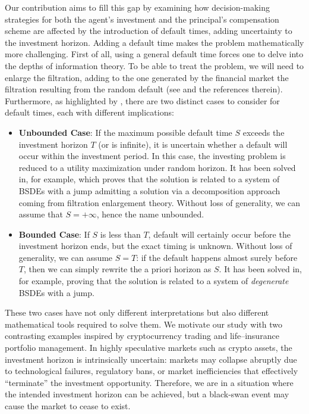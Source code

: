 \documentclass[11pt,a4paper]{article}
\theoremstyle{thmstyleone}%
\theoremstyle{thmstyletwo}%
\theoremstyle{thmstylethree}%
\begin{document}
Our contribution aims to fill this gap by examining how decision-making strategies for both the agent's investment and the principal's compensation scheme are affected by the introduction of default times, adding uncertainty to the investment horizon. Adding a default time makes the problem mathematically more challenging. First of all, using a general default time forces one to delve into the depths of information theory. To be able to treat the problem, we will need to enlarge the filtration, adding to the one generated by the financial market the filtration resulting from the random default (see \cite{jeanblanc2009mathematical,bielecki2013credit,aksamit2017enlargement,Guo_2008} and the references therein). Furthermore, as highlighted by \cite{jeanblanc2015utility}, there are two distinct cases to consider for default times, each with different implications:
\begin{itemize}
    \item \textbf{Unbounded Case}: If the maximum possible default time $S$ exceeds the investment horizon $T$ (or is infinite), it is uncertain whether a default will occur within the investment period. In this case, the investing problem is reduced to a utility maximization under random horizon. It has been solved in, for example, \cite{ kharroubi2013mean} which proves that the solution is related to a system of BSDEs with a jump admitting a solution via a decomposition approach coming from filtration enlargement theory. Without loss of generality, we can assume that $S = +\infty$, hence the name unbounded.
    \item \textbf{Bounded Case}: If $S$ is less than $T$, default will certainly occur before the investment horizon ends, but the exact timing is unknown. Without loss of generality, we can assume $S = T$: if the default happens almost surely before $T$, then we can simply rewrite the a priori horizon as $S$. It has been solved in, for example, \cite{jeanblanc2014note,jeanblanc2015utility} proving that the solution is related to a system of \textit{degenerate} BSDEs with a jump.
\end{itemize}
These two cases have not only different interpretations but also different mathematical tools required to solve them. 
We motivate our study with two contrasting examples inspired by
cryptocurrency trading and life–insurance portfolio management.
In highly speculative markets such as crypto assets, the investment
horizon is intrinsically uncertain: markets may collapse abruptly due to technological failures, regulatory bans, or market inefficiencies that effectively ``terminate'' the investment opportunity. Therefore, we are in a situation where the intended investment horizon can be achieved, but a black-swan event may cause the market to cease to exist.
\end{document}
